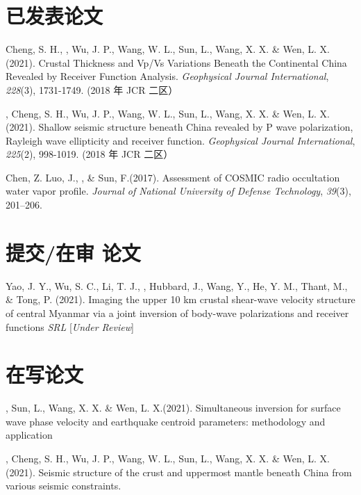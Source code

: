 \newcommand{\Revision}{\textit{under revision}}
\newcommand{\CS}{*} %
\newcommand{\CF}{\textsuperscript{\#}} %


\section*{已发表论文}

\begin{etaremune}
\item
    Cheng, S. H., \Xiao, Wu, J. P., Wang, W. L., Sun, L., Wang, X. X. \& Wen, L. X.(2021).
    Crustal Thickness and Vp/Vs Variations Beneath the Continental China Revealed by Receiver Function Analysis.
    \textit{Geophysical Journal International}, \textit{228}(3), 1731-1749. (2018 年 JCR 二区）
\item
    \Xiao, Cheng, S. H., Wu, J. P., Wang, W. L., Sun, L., Wang, X. X. \& Wen, L. X.(2021).
    Shallow seismic structure beneath China revealed by P wave polarization, Rayleigh wave ellipticity and receiver function.
    \textit{Geophysical Journal International}, \textit{225}(2), 998-1019. (2018 年 JCR 二区）
\item
    Chen, Z. Luo, J.,  \Xiao, \& Sun, F.(2017).
    Assessment of COSMIC radio occultation water vapor profile.
    \textit{Journal of National University of Defense Technology}, \textit{39}(3), 201--206. 
\end{etaremune}

\section*{提交/在审 论文}
\begin{etaremune}
\item
    Yao, J. Y., Wu, S. C., Li, T. J., \Xiao, Hubbard, J., Wang, Y., He, Y. M., Thant, M., \& Tong, P. (2021).
    Imaging the upper 10 km crustal shear-wave velocity structure of central Myanmar via a joint inversion of body-wave polarizations and receiver functions
    \textit{SRL} [\textit{Under Review}]
\end{etaremune}

\section*{在写论文}
\begin{etaremune}
\item
    \Xiao, Sun, L., Wang, X. X. \& Wen, L. X.(2021).
    Simultaneous inversion for surface wave phase velocity and earthquake centroid parameters: methodology and application
\item
    \Xiao, Cheng, S. H., Wu, J. P., Wang, W. L., Sun, L., Wang, X. X. \& Wen, L. X.(2021).
    Seismic structure of the crust and uppermost mantle beneath China from various seismic constraints.
\end{etaremune}


